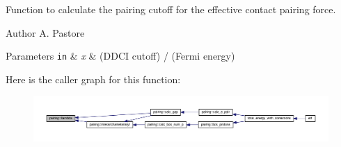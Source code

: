 Function to calculate the pairing cutoff for the effective contact pairing force. 

\begin{DoxyAuthor}{Author}
A. Pastore 
\end{DoxyAuthor}

\begin{DoxyParams}[1]{Parameters}
\mbox{\tt in}  & {\em x} & (D\+D\+CI cutoff) / (Fermi energy) \\
\hline
\end{DoxyParams}
Here is the caller graph for this function\+:
\nopagebreak
\begin{figure}[H]
\begin{center}
\leavevmode
\includegraphics[width=350pt]{namespacepairing_ab022f3dcf7994e9f95315b3b2007a9ee_icgraph}
\end{center}
\end{figure}
